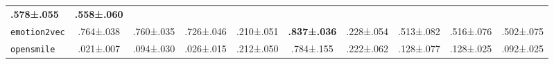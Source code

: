 \begin{table*}[]
\begin{tabular}{l|ccc|ccc|ccc}
  \cellcolor[HTML]{D9EAD3}\textbf{.578\scriptsize±.055} &
  \cellcolor[HTML]{D9EAD3}\textbf{.558\scriptsize±.060} \\
\texttt{emotion2vec} &
  .764\scriptsize±.038 &
  .760\scriptsize±.035 &
  .726\scriptsize±.046 &
  .210\scriptsize±.051 &
  \cellcolor[HTML]{D9EAD3}\textbf{.837\scriptsize±.036} &
  .228\scriptsize±.054 &
  .513\scriptsize±.082 &
  .516\scriptsize±.076 &
  .502\scriptsize±.075 \\
\texttt{opensmile} &
  .021\scriptsize±.007 &
  .094\scriptsize±.030 &
  .026\scriptsize±.015 &
  .212\scriptsize±.050 &
  .784\scriptsize±.155 &
  .222\scriptsize±.062 &
  .128\scriptsize±.077 &
  .128\scriptsize±.025 &
  .092\scriptsize±.025 \\
\bottomrule
\end{tabular}
\end{table*}
